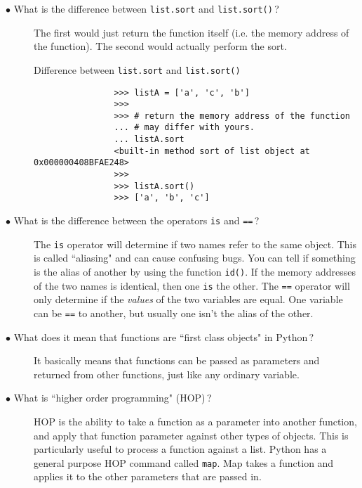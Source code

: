 \documentclass{article}
\newcommand{\inlinecode}[1]{\texttt{#1}}
\newcommand{\question}[1]{\item[$\bullet$ #1] \hfil}
\newenvironment{answer}{\newline}{}
\newenvironment{faq}{\begin{description}}{\end{description}}
\begin{document}
\begin{faq}
		\question{What is the difference between \inlinecode{list.sort} and \inlinecode{list.sort()}\,?}
		\begin{answer}
			The first would just return the function itself (i.e. the memory address of the function). The second would actually perform the sort.
			
			\begin{table}[hbp]
				\caption{Difference between \texttt{list.sort} and \texttt{list.sort()}}
				\begin{verbatim}
				>>> listA = ['a', 'c', 'b']
				>>>
				>>> # return the memory address of the function
				... # may differ with yours.
				... listA.sort
				<built-in method sort of list object at 0x000000408BFAE248>
				>>>
				>>> listA.sort()
				>>> ['a', 'b', 'c']
				\end{verbatim}
			\end{table}
		\end{answer}
		
		\question{What is the difference between the operators \inlinecode{is} and \inlinecode{==}\,?}
		\begin{answer}
			The \inlinecode{is} operator will determine if two names refer to the same object. This is called ``aliasing" and can cause confusing bugs. You can tell if something is the alias of another by using the function \inlinecode{id()}. If the memory addresses of the two names is identical, then one \inlinecode{is} the other. The \inlinecode{==} operator will only determine if the \textit{values} of the two variables are equal. One variable can be \inlinecode{==} to another, but usually one isn't the alias of the other.
		\end{answer}
		
		\question{What does it mean that functions are ``first class objects" in Python\,?}
		\begin{answer}
			It basically means that functions can be passed as parameters and returned from other functions, just like any ordinary variable.
		\end{answer}
		
		\question{What is ``higher order programming" (HOP)\,?}
		\begin{answer}
			HOP is the ability to take a function as a parameter into another function, and apply that function parameter against other types of objects.  This is particularly useful to process a function against a list. Python has a general purpose HOP command called \inlinecode{map}. Map takes a function and applies it to the other parameters that are passed in.
		\end{answer}
		

\end{faq}
\end{document}

